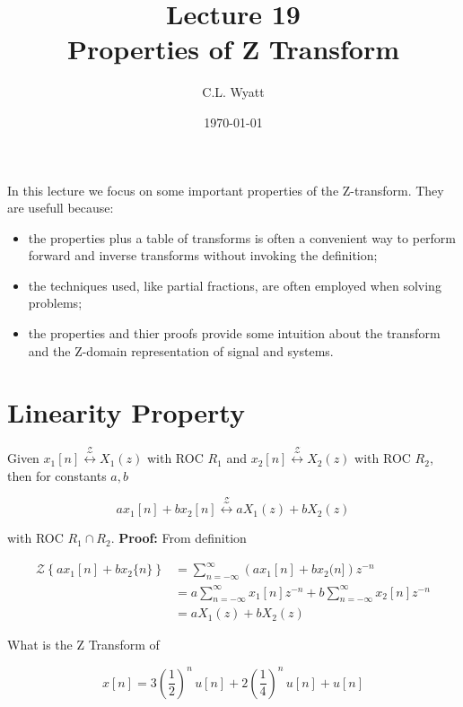 \documentclass{article}
\begin{document}
\title{Lecture 19\\Properties of Z Transform}
\author{C.L. Wyatt}
\date{\today}
\maketitle

In this lecture we focus on some important properties of the Z-transform. They are usefull because:

\begin{itemize}
	\item the properties plus a table of transforms is often a convenient way to perform forward and inverse transforms without invoking the definition;
	\item the techniques used, like partial fractions, are often employed when solving problems;
	\item the properties and thier proofs provide some intuition about the transform and the Z-domain representation of signal and systems.
\end{itemize}

\section{Linearity Property}

Given $x_{1}[n] \stackrel{\mathcal{Z}}{\longleftrightarrow} X_{1}(z)$ with ROC $R_{1}$ and $x_{2}[n] \stackrel{\mathcal{Z}}{\longleftrightarrow} X_{2}(z)$ with ROC $R_{2}$, then for constants $a, b$

$$
	a x_{1}[n]+b x_{2}[n] \stackrel{\mathcal{Z}}{\longleftrightarrow} a X_{1}(z)  +b X_{2}(z)
$$

with ROC $R_1 \cap R_2$.
\textbf{Proof:} From definition

$$
	\begin{aligned}
		\mathcal{Z}\left\{a x_{1}[n]+b x_{2}\{n\}\right\} & = \sum_{n=-\infty}^{\infty}\left(a x_{1}[n]+b x_{2}(n]\right) z^{-n}                      \\
		                                                  & = a \sum_{n=-\infty}^{\infty} x_{1}[n] z^{-n}+b \sum_{n=-\infty}^{\infty} x_{2}[n] z^{-n} \\
		                                                  & =a X_{1}(z)+b X_{2}(z)
	\end{aligned}
$$

 What is the Z Transform of

$$
	x[n] = 3\left(\frac{1}{2} \right)^n\, u[n] + 2\left(\frac{1}{4} \right)^n\, u[n] + u[n]
$$
\end{document}
